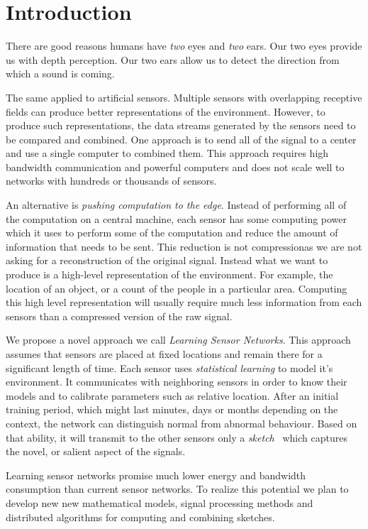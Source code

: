 \section{Introduction}
There are good reasons humans have {\em two} eyes and {\em two}
ears. Our two eyes provide us with depth perception. Our two ears
allow us to detect the direction from which a sound is coming.

The same applied to artificial sensors. Multiple sensors with
overlapping receptive fields can produce better representations of the
environment. However, to produce such representations, the data
streams generated by the sensors need to be compared and combined. One
approach is to send all of the signal to a center and use a single
computer to combined them. This approach requires high bandwidth
communication and powerful computers and does not scale well to
networks with hundreds or thousands of sensors.


An alternative is {\em pushing computation to the edge}. Instead of
performing all of the computation on a central machine, each sensor
has some computing power which it uses to perform some of the
computation and reduce the amount of information that needs to be
sent. This reduction is not compressionas we are not asking for a
reconstruction of the original signal. Instead what we want to produce
is a high-level representation of the environment. For example, the
location of an object, or a count of the people in a particular
area. Computing this high level representation will usually require
much less information from each sensors than a compressed version of
the raw signal.

We propose a novel approach we call {\em Learning Sensor Networks}.
This approach assumes that sensors are placed at fixed locations and
remain there for a significant length of time.
Each sensor uses {\em statistical learning} to model it's
environment. It communicates with neighboring sensors in order to know
their models and to calibrate parameters such as relative
location. After an initial training period, which might last minutes,
days or months depending on the context, the network can distinguish
normal from abnormal behaviour. Based on that ability, it will
transmit to the other sensors only a {\em sketch}~\cite{} which captures the
novel, or salient aspect of the signals.

Learning sensor networks promise much lower energy and bandwidth
consumption than current sensor networks. To realize this potential we
plan to develop new new mathematical models, signal processing
methods and distributed algorithms for computing and combining
sketches. 


